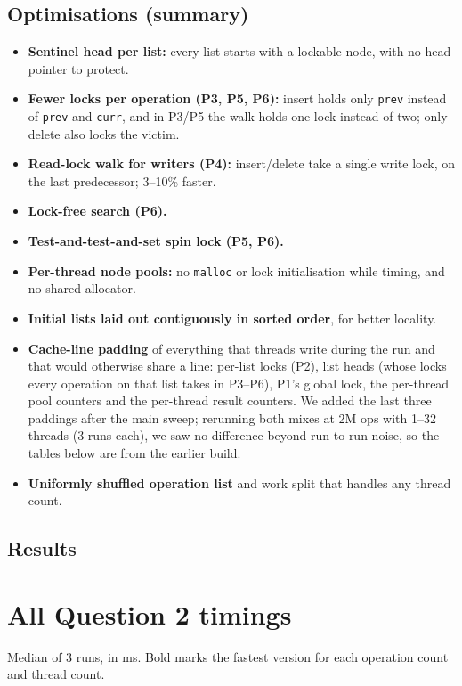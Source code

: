 \documentclass[10pt,a4paper]{article}
\begin{document}
\subsection{Optimisations (summary)}
\begin{itemize}
\item \textbf{Sentinel head per list:} every list starts with a lockable node, with no head pointer to protect.
\item \textbf{Fewer locks per operation (P3, P5, P6):} insert holds only \texttt{prev} instead of \texttt{prev} and \texttt{curr}, and in P3/P5 the walk holds one lock instead of two; only delete also locks the victim.
\item \textbf{Read-lock walk for writers (P4):} insert/delete take a single write lock, on the last predecessor; 3--10\% faster.
\item \textbf{Lock-free search (P6).}
\item \textbf{Test-and-test-and-set spin lock (P5, P6).}
\item \textbf{Per-thread node pools:} no \texttt{malloc} or lock initialisation while timing, and no shared allocator.
\item \textbf{Initial lists laid out contiguously in sorted order}, for better locality.
\item \textbf{Cache-line padding} of everything that threads write during the run and that would otherwise share a line: per-list locks (P2), list heads (whose locks every operation on that list takes in P3--P6), P1's global lock, the per-thread pool counters and the per-thread result counters.
  We added the last three paddings after the main sweep; rerunning both mixes at 2M ops with 1--32 threads (3 runs each), we saw no difference beyond run-to-run noise, so the tables below are from the earlier build.
\item \textbf{Uniformly shuffled operation list} and work split that handles any thread count.
\end{itemize}

\subsection{Results}


\appendix
\section{All Question 2 timings}
\label{app:q2}
Median of 3 runs, in ms. Bold marks the fastest version for each operation count and thread count.

\begin{center}\scriptsize

\end{center}
\end{document}
